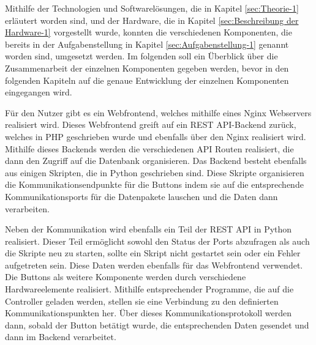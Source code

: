 Mithilfe der Technologien und Softwarelösungen, die in Kapitel \ref{sec:Theorie-1} erläutert worden sind, und der Hardware, die in Kapitel \ref{sec:Beschreibung der Hardware-1} vorgestellt wurde, konnten die verschiedenen Komponenten, die bereits in der Aufgabenstellung in Kapitel \ref{sec:Aufgabenstellung-1} genannt worden sind, umgesetzt werden. 
Im folgenden soll ein Überblick über die Zusammenarbeit der einzelnen Komponenten gegeben werden, bevor in den folgenden Kapiteln auf die genaue Entwicklung der einzelnen Komponenten eingegangen wird. 

Für den Nutzer gibt es ein Webfrontend, welches mithilfe eines Nginx Webservers realisiert wird. Dieses Webfrontend greift auf ein \ac{REST} \ac{API}-Backend zurück, welches in \ac{PHP} geschrieben wurde und ebenfalls über den Nginx realisiert wird. Mithilfe dieses Backends werden die verschiedenen API Routen realisiert, die dann den Zugriff auf die Datenbank organisieren. Das Backend besteht ebenfalls aus einigen Skripten, die in Python geschrieben sind. Diese Skripte organisieren die Kommunikationsendpunkte für die Buttons indem sie auf die entsprechende Kommunikationsports für die Datenpakete lauschen und die Daten dann verarbeiten. 

Neben der Kommunikation wird ebenfalls ein Teil der \ac{REST} \ac{API} in Python realisiert. Dieser Teil ermöglicht sowohl den Status der Ports abzufragen als auch die Skripte neu zu starten, sollte ein Skript nicht gestartet sein oder ein Fehler aufgetreten sein. Diese Daten werden ebenfalls für das Webfrontend verwendet. 
Die Buttons als weitere Komponente werden durch verschiedene Hardwareelemente realisiert. Mithilfe entsprechender Programme, die auf die Controller geladen werden, stellen sie eine Verbindung zu den definierten Kommunikationspunkten her. Über dieses Kommunikationsprotokoll werden dann, sobald der Button betätigt wurde, die entsprechenden Daten gesendet und dann im Backend verarbeitet. 
